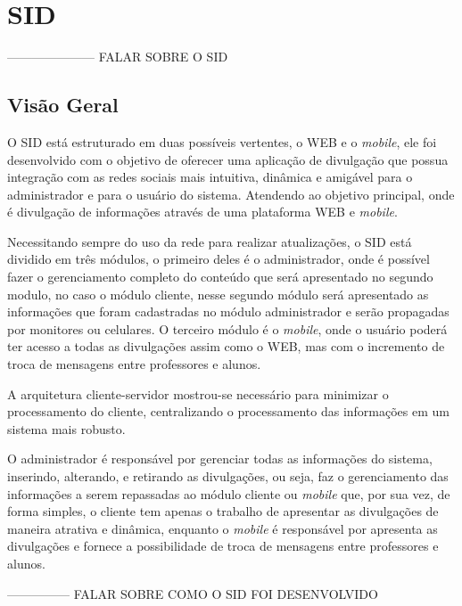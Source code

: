 \chapter[SID]{SID}
--------------------- FALAR SOBRE O SID

\section{Visão Geral}
O SID está estruturado em duas possíveis vertentes, o WEB e o \textit{mobile}, ele foi desenvolvido com o objetivo de oferecer uma aplicação de divulgação que possua integração com as redes sociais mais intuitiva, dinâmica e amigável para o administrador e para o usuário do sistema. Atendendo ao objetivo principal, onde é divulgação de informações através de uma plataforma WEB e \textit{mobile}.

Necessitando sempre do uso da rede para realizar atualizações, o SID está dividido em três módulos, o primeiro deles é o administrador, onde é possível fazer o gerenciamento completo do conteúdo que será apresentado no segundo modulo, no caso o módulo cliente, nesse segundo módulo será apresentado as informações que foram cadastradas no módulo
administrador e serão propagadas por monitores ou celulares. O terceiro módulo é o \textit{mobile}, onde o usuário poderá ter acesso a todas as divulgações assim como o WEB, mas com o incremento de troca de mensagens entre professores e alunos. 

A arquitetura cliente-servidor mostrou-se necessário para minimizar o processamento do cliente, centralizando o processamento das informações em um sistema mais robusto.

O administrador é responsável por gerenciar todas as informações do sistema, inserindo, alterando, e retirando as divulgações, ou seja, faz o gerenciamento das informações a serem repassadas ao módulo cliente ou \textit{mobile} que, por sua vez, de forma simples, o cliente tem apenas o trabalho de apresentar as divulgações de maneira atrativa e dinâmica, enquanto o \textit{mobile} é responsável por apresenta as divulgações e fornece a possibilidade de troca de mensagens entre professores e alunos. 


--------------- FALAR SOBRE COMO O SID FOI DESENVOLVIDO

